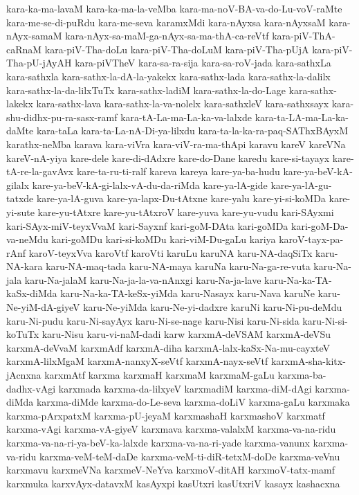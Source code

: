 {kara-ka-ma-lavaM
kara-ka-ma-la-veMba
kara-ma-noV-BA-va-do-Lu-voV-raMte
kara-me-se-di-puRdu
kara-me-seva
karamxMdi
kara-nAyxsa
kara-nAyxsaM
kara-nAyx-samaM
kara-nAyx-sa-maM-ga-nAyx-sa-ma-thA-ca-reVtf
kara-piV-ThA-caRnaM
kara-piV-Tha-doLu
kara-piV-Tha-doLuM
kara-piV-Tha-pUjA
kara-piV-Tha-pU-jAyAH
kara-piVTheV
kara-sa-ra-sija
kara-sa-roV-jada
kara-sathxLa
kara-sathxla
kara-sathx-la-dA-la-yakekx
kara-sathx-lada
kara-sathx-la-dalilx
kara-sathx-la-da-lilxTuTx
kara-sathx-ladiM
kara-sathx-la-do-Lage
kara-sathx-lakekx
kara-sathx-lava
kara-sathx-la-va-nolelx
kara-sathxleV
kara-sathxsayx
kara-shu-didhx-pu-ra-sasx-ramf
kara-tA-La-ma-La-ka-va-lalxde
kara-ta-LA-ma-La-ka-daMte
kara-taLa
kara-ta-La-nA-Di-ya-lilxdu
kara-ta-la-ka-ra-paq-SAThxBAyxM
karathx-neMba
karava
kara-viVra
kara-viV-ra-ma-thApi
karavu
kareV
kareVNa
kareV-nA-yiya
kare-dele
kare-di-dAdxre
kare-do-Dane
karedu
kare-si-tayayx
kare-tA-re-la-gavAvx
kare-ta-ru-ti-ralf
kareva
kareya
kare-ya-ba-hudu
kare-ya-beV-kA-gilalx
kare-ya-beV-kA-gi-lalx-vA-du-da-riMda
kare-ya-lA-gide
kare-ya-lA-gu-tatxde
kare-ya-lA-guva
kare-ya-lapx-Du-tAtxne
kare-yalu
kare-yi-si-koMDa
kare-yi-sute
kare-yu-tAtxre
kare-yu-tAtxroV
kare-yuva
kare-yu-vudu
kari-SAyxmi
kari-SAyx-miV-teyxVvaM
kari-Sayxnf
kari-goM-DAta
kari-goMDa
kari-goM-Da-va-neMdu
kari-goMDu
kari-si-koMDu
kari-viM-Du-gaLu
kariya
karoV-tayx-pa-rAnf
karoV-teyxVva
karoVtf
karoVti
karuLu
karuNA
karu-NA-daqSiTx
karu-NA-kara
karu-NA-maq-tada
karu-NA-maya
karuNa
karu-Na-ga-re-vuta
karu-Na-jala
karu-Na-jalaM
karu-Na-ja-la-va-nAnxgi
karu-Na-ja-lave
karu-Na-ka-TA-kaSx-diMda
karu-Na-ka-TA-keSx-yiMda
karu-Nasayx
karu-Nava
karuNe
karu-Ne-yiM-dA-giyeV
karu-Ne-yiMda
karu-Ne-yi-dadxre
karuNi
karu-Ni-pu-deMdu
karu-Ni-pudu
karu-Ni-sayAyx
karu-Ni-se-nage
karu-Nisi
karu-Ni-sida
karu-Ni-si-koTuTx
karu-Nisu
karu-vi-naM-dadi
karw
karxmA-deVSAM
karxmA-deVSu
karxmA-deVvaM
karxmAdf
karxmA-diha
karxmA-lalx-kaSx-Na-mu-cayxteV
karxmA-lilxMgaM
karxmA-nanxyX-seVtf
karxmA-nayx-seVtf
karxmA-sha-kitx-jAcnxna
karxmAtf
karxma
karxmaH
karxmaM
karxmaM-gaLu
karxma-ba-dadhx-vAgi
karxmada
karxma-da-lilxyeV
karxmadiM
karxma-diM-dAgi
karxma-diMda
karxma-diMde
karxma-do-Le-seva
karxma-doLiV
karxma-gaLu
karxmaka
karxma-pArxpatxM
karxma-pU-jeyaM
karxmashaH
karxmashoV
karxmatf
karxma-vAgi
karxma-vA-giyeV
karxmava
karxma-valalxM
karxma-va-na-ridu
karxma-va-na-ri-ya-beV-ka-lalxde
karxma-va-na-ri-yade
karxma-vanunx
karxma-va-ridu
karxma-veM-teM-daDe
karxma-veM-ti-diR-tetxM-doDe
karxma-veVnu
karxmavu
karxmeVNa
karxmeV-NeYva
karxmoV-ditAH
karxmoV-tatx-mamf
karxmuka
karxvAyx-datavxM
kasAyxpi
kasUtxri
kasUtxriV
kasayx
kashacxna
}
